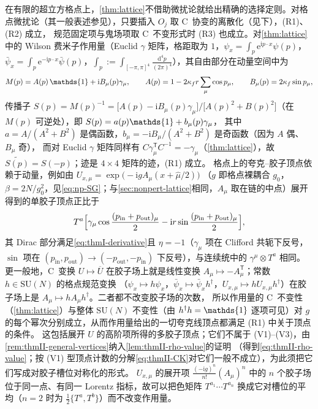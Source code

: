 \documentclass[UTF8,a4paper,11pt,fontset=fandol]{ctexart}
\let\amsmathbb\mathbb
\renewcommand{\mathbb}[1]{\ifx1#1\mathds{1}\else\amsmathbb{#1}\fi}
\theoremstyle{cplain}
\theoremstyle{cdefinition}
\theoremstyle{cremark}
\numberwithin{equation}{section}
\newcommand{\dd}{\mathrm{d}}                         %
\newcommand{\tp}{\mathsf{T}}                         %
\newcommand{\ii}{\mathrm{i}}                        %
\newcommand{\ee}{\mathrm{e}}                        %
\newcommand{\Cconj}[1]{\widetilde{#1}}              %
\begin{document}
在有限的超立方格点上，\cref{thm:lattice}不借助微扰论就给出精确的选择定则。对格点微扰论（其一般表述参见\cite{MontvayMunster1994}），只要插入 $O_j$ 取 C~协变的离散化（见下），(R1)、(R2) 成立，
规范固定项与鬼场项取 C~不变形式时 (R3) 也成立。对\cref{thm:lattice}中的 Wilson 费米子作用量（Euclid $\gamma$ 矩阵，格距取为 $1$，$\psi_x=\int_p\ee^{\ii p\cdot x}\psi(p)$，
$\bar\psi_x=\int_p\ee^{-\ii p\cdot x}\bar\psi(p)$，$\int_p:=\int_{[-\pi,\pi]^4}\frac{\dd^4p}{(2\pi)^4}$），其自由部分在动量空间中为
\begin{equation}\label{eq:reg-wilson}
M(p)=A(p)\,\mathbb 1+\ii B_\mu(p)\gamma_\mu,\qquad A(p)=1-2\kappa_f r\sum_\mu\cos p_\mu,\qquad B_\mu(p)=2\kappa_f\sin p_\mu ,
\end{equation}
传播子 $S(p)=M(p)^{-1}=\bigl[A(p)-\ii B_\mu(p)\gamma_\mu\bigr]/\bigl[A(p)^2+B(p)^2\bigr]$（在 $M(p)$ 可逆处），即 $S(p)=a(p)\mathbb 1+b_\mu(p)\gamma_\mu$，
其中 $a=A/(A^2+B^2)$ 是偶函数，$b_\mu=-\ii B_\mu/(A^2+B^2)$ 是奇函数（因为 $A$ 偶、$B_\mu$ 奇），
而对 Euclid $\gamma$ 矩阵同样有 $C\gamma_\mu^{\tp}C^{-1}=-\gamma_\mu$（\cref{thm:lattice}），故 $\Cconj{S(p)}=S(-p)$；迹是 $4\times4$ 矩阵的迹，(R1) 成立。
格点上的夸克--胶子顶点依赖于动量，例如由 $U_{x,\mu}=\exp\bigl(-\ii gA_\mu(x+\hat\mu/2)\bigr)$
（$g$ 即格点裸耦合 $g_0$，$\beta=2N/g_0^2$，见\cref{eq:np-SG}；与\cref{sec:nonpert-lattice}相同，$A_\mu$ 取在链的中点）展开得到的单胶子顶点正比于
\[
T^a\Bigl[\gamma_\mu\cos\frac{(p_{\mathrm{in}}+p_{\mathrm{out}})_\mu}{2}-\ii r\sin\frac{(p_{\mathrm{in}}+p_{\mathrm{out}})_\mu}{2}\Bigr],
\]
其 Dirac 部分满足\cref{eq:thmI-derivative}且 $\eta=-1$（$\gamma_\mu$ 项在 Clifford 共轭下反号，$\sin$ 项在 $(p_{\mathrm{in}},p_{\mathrm{out}})\to(-p_{\mathrm{out}},-p_{\mathrm{in}})$ 下反号），与连续统中的 $\gamma^\mu\otimes T^a$ 相同。
更一般地，C~变换 $U\mapsto\overline U$ 在胶子场上就是线性变换 $A_\mu\mapsto-A_\mu^{\tp}$；常数 $h\in\mathrm{SU}(N)$ 的格点规范变换
（$\psi_x\mapsto h\psi_x$，$\bar\psi_x\mapsto\bar\psi_xh^\dagger$，$U_{x,\mu}\mapsto hU_{x,\mu}h^\dagger$）在胶子场上是 $A_\mu\mapsto hA_\mu h^\dagger$。二者都不改变胶子场的次数，
所以作用量的 C~不变性（\cref{thm:lattice}）与整体 $\mathrm{SU}(N)$ 不变性（由 $h^\dagger h=\mathbb 1$ 逐项可见）对 $g$ 的每个幂次分别成立，从而作用量给出的一切夸克线顶点都满足 (R1) 中关于顶点的条件。
这包括展开 $U$ 的高阶项所得的多胶子顶点；它们不属于 (V1)--(V3)，由\cref{rem:thmII-general-vertices}纳入\cref{lem:thmII-rho-value}的证明
（得到\cref{eq:thmII-rho-value}；按 (V1) 型顶点计数的分解\cref{eq:thmII-CK}对它们一般不成立），为此须把它们写成对胶子槽位对称化的形式。
$U_{x,\mu}$ 的展开项 $\frac{(-\ii g)^n}{n!}(A_\mu)^n$ 中的 $n$ 个胶子场位于同一点、有同一 Lorentz 指标，故可以把色矩阵 $T^{a_1}\cdots T^{a_n}$ 换成它对槽位的平均（$n=2$ 时为 $\frac12\{T^a,T^b\}$）而不改变作用量。
\end{document}
